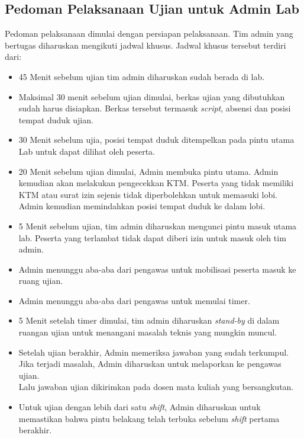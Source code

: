\subsection{Pedoman Pelaksanaan Ujian untuk Admin Lab}
    Pedoman pelaksanaan dimulai dengan persiapan pelaksanaan. Tim admin yang
    bertugas diharuskan mengikuti jadwal khusus. Jadwal khusus tersebut terdiri
    dari:
    \begin{itemize}
        \item 45 Menit sebelum ujian tim admin diharuskan sudah berada di lab.
        \item Maksimal 30 menit sebelum ujian dimulai, berkas ujian yang
            dibutuhkan sudah harus disiapkan. Berkas tersebut termasuk
            \textit{script}, absensi dan posisi tempat duduk ujian. 
        \item 30 Menit sebelum ujia, posisi tempat duduk ditempelkan pada pintu
            utama Lab untuk dapat dilihat oleh peserta.
        \item 20 Menit sebelum ujian dimulai, Admin membuka pintu utama. Admin
            kemudian akan melakukan pengecekkan KTM. Peserta yang tidak memiliki
            KTM atau surat izin sejenis tidak diperbolehkan untuk memasuki
            lobi. \\
            Admin kemudian memindahkan posisi tempat duduk ke dalam lobi.
        \item 5 Menit sebelum ujian, tim admin diharuskan mengunci pintu masuk
            utama lab. Peserta yang terlambat tidak dapat diberi izin untuk
            masuk oleh tim admin.
        \item Admin menunggu aba-aba dari pengawas untuk mobilisasi peserta
            masuk ke ruang ujian.
        \item Admin menunggu aba-aba dari pengawas untuk memulai timer.
        \item 5 Menit setelah timer dimulai, tim admin diharuskan
            \textit{stand-by} di dalam ruangan ujian untuk menangani masalah
            teknis yang mungkin muncul.
        \item Setelah ujian berakhir, Admin memeriksa jawaban yang sudah
            terkumpul. Jika terjadi masalah, Admin diharuskan untuk melaporkan
            ke pengawas ujian. \\
        Lalu jawaban ujian dikirimkan pada dosen mata kuliah yang bersangkutan.
        \item Untuk ujian dengan lebih dari satu \textit{shift}, Admin
            diharuskan untuk memastikan bahwa pintu belakang telah terbuka
            sebelum \textit{shift} pertama berakhir.
    \end{itemize}

